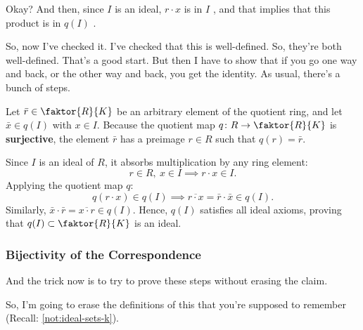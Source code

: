 \begin{proofWrapper}
\begin{speech}[00:26:54 - 00:28:26]
Okay? And then, since $I$ is an ideal, $r \cdot x$ is in $I$ , and that implies that this product is in $q(I)$ .

So, now I've checked it. I've checked that this is well-defined. So, they're both well-defined. That's a good start. But then I have to show that if you go one way and back, or the other way and back, you get the identity. As usual, there's a bunch of steps.
\end{speech}

\begin{content}
Let $\bar{r} \in \faktor{R}{K}$ be an arbitrary element of the quotient ring, and let $\bar{x} \in q(I)$ with $x \in I$.
Because the quotient map $q \colon R \to \faktor{R}{K}$ is \textbf{surjective}, the element $\bar{r}$ has a preimage $r \in R$ such that $q(r) = \bar{r}$.

Since $I$ is an ideal of $R$, it absorbs multiplication by any ring element:
\[
r \in R, \ x \in I \implies r \cdot x \in I.
\]
Applying the quotient map $q$:
\[
q(r \cdot x) \in q(I) \implies \overline{r \cdot x} = \bar{r} \cdot \bar{x} \in q(I).
\]
Similarly, $\bar{x} \cdot \bar{r} = \overline{x \cdot r} \in q(I)$.
Hence, $q(I)$ satisfies all ideal axioms, proving that $q(I) \subset \faktor{R}{K}$ is an ideal.
\end{content}

\begin{hidden}
\end{hidden}

\subsubsection{Bijectivity of the Correspondence}

\begin{speech}[00:28:35 - 00:30:18]
And the trick now is to try to prove these steps without erasing the claim.

So, I'm going to erase the definitions of this that you're supposed to remember (Recall: \cref{not:ideal-sets-k}). 


\end{speech}
\end{proofWrapper}
